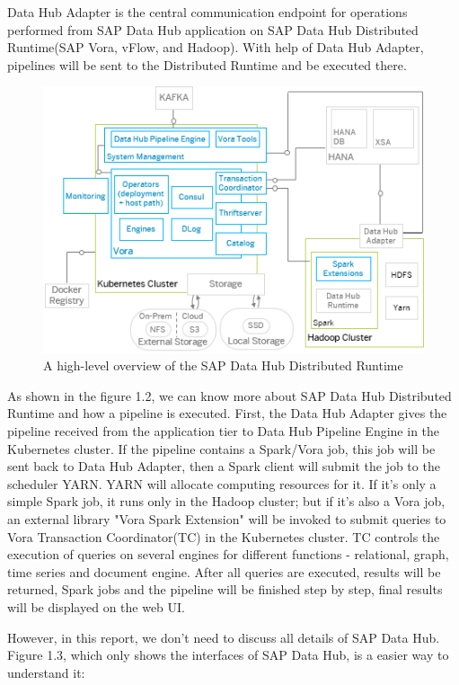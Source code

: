 \documentclass[article,colorback,accentcolor=tud4c]{tudreport}
\begin{document}
Data Hub Adapter is the central communication endpoint for operations performed from SAP Data Hub application on SAP Data Hub Distributed Runtime(SAP Vora, vFlow, and Hadoop). With help of Data Hub Adapter, pipelines will be sent to the Distributed Runtime and be executed there.

\begin{figure}[!h]
	\centering
	\includegraphics{vora}
	\caption{A high-level overview of the SAP Data Hub Distributed Runtime}
\end{figure}

As shown in the figure 1.2, we can know more about SAP Data Hub Distributed Runtime and how a pipeline is executed. First, the Data Hub Adapter gives the pipeline received from the application tier to Data Hub Pipeline Engine in the Kubernetes cluster. If the pipeline contains a Spark/Vora job, this job will be sent back to Data Hub Adapter, then a Spark client will submit the job to the scheduler YARN. YARN will allocate computing resources for it. If it's only a simple Spark job, it runs only in the Hadoop cluster; but if it's also a Vora job, an external library "Vora Spark Extension" will be invoked to submit queries to Vora Transaction Coordinator(TC) in the Kubernetes cluster. TC controls the execution of queries on several engines for different functions - relational, graph, time series and document engine. After all queries are executed, results will be returned, Spark jobs and the pipeline will be finished step by step, final results will be displayed on the web UI. 

However, in this report, we don't need to discuss all details of SAP Data Hub. Figure 1.3, which only shows the interfaces of SAP Data Hub, is a easier way to understand it:
\end{document}
